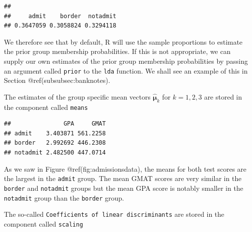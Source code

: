 \documentclass[
]{article}
\newenvironment{Shaded}{\begin{snugshade}}{\end{snugshade}}
\newcommand{\DocumentationTok}[1]{\textcolor[rgb]{0.56,0.35,0.01}{\textbf{\textit{#1}}}}
\newcommand{\FunctionTok}[1]{\textcolor[rgb]{0.13,0.29,0.53}{\textbf{#1}}}
\newcommand{\NormalTok}[1]{#1}
\newcommand{\SpecialCharTok}[1]{\textcolor[rgb]{0.81,0.36,0.00}{\textbf{#1}}}
\begin{document}
\begin{Shaded}
\end{Shaded}

\begin{verbatim}
## 
##     admit    border  notadmit 
## 0.3647059 0.3058824 0.3294118
\end{verbatim}

We therefore see that by default, R will use the sample proportions to
estimate the prior group membership probabilities. If this is not
appropriate, we can supply our own estimates of the prior group
membership probabilities by passing an argument called \texttt{prior} to
the \texttt{lda} function. We shall see an example of this in Section
@ref(subsubsec:banknotes).

The estimates of the group specific mean vectors
\(\boldsymbol{\hat{\mu}}_k\) for \(k=1,2,3\) are stored in the component
called \texttt{means}

\begin{Shaded}
\end{Shaded}

\begin{verbatim}
##               GPA     GMAT
## admit    3.403871 561.2258
## border   2.992692 446.2308
## notadmit 2.482500 447.0714
\end{verbatim}

As we saw in Figure @ref(fig:admissionsdata), the means for both test
scores are the largest in the \texttt{admit} group. The mean GMAT scores
are very similar in the \texttt{border} and \texttt{notadmit} groups but
the mean GPA score is notably smaller in the \texttt{notadmit} group
than the \texttt{border} group.

The so-called \texttt{Coefficients\ of\ linear\ discriminants} are
stored in the component called \texttt{scaling}

\begin{Shaded}
\end{Shaded}
\end{document}
